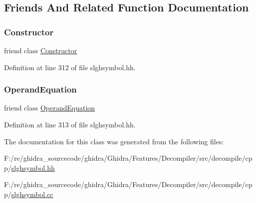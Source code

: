 \subsection{Friends And Related Function Documentation}
\mbox{\label{class_operand_symbol_a519e920ccec7617186a838b3258ff7d2}} 
\subsubsection{\texorpdfstring{Constructor}{Constructor}}
{\footnotesize\ttfamily friend class \mbox{\hyperlink{class_constructor}{Constructor}}\hspace{0.3cm}{\ttfamily [friend]}}



Definition at line 312 of file slghsymbol.\+hh.

\mbox{\label{class_operand_symbol_a466eb718dfbfae6a840e546d48e95627}} 
\subsubsection{\texorpdfstring{OperandEquation}{OperandEquation}}
{\footnotesize\ttfamily friend class \mbox{\hyperlink{class_operand_equation}{Operand\+Equation}}\hspace{0.3cm}{\ttfamily [friend]}}



Definition at line 313 of file slghsymbol.\+hh.



The documentation for this class was generated from the following files\+:\begin{DoxyCompactItemize}
\item 
F\+:/re/ghidra\+\_\+sourcecode/ghidra/\+Ghidra/\+Features/\+Decompiler/src/decompile/cpp/\mbox{\hyperlink{slghsymbol_8hh}{slghsymbol.\+hh}}\item 
F\+:/re/ghidra\+\_\+sourcecode/ghidra/\+Ghidra/\+Features/\+Decompiler/src/decompile/cpp/\mbox{\hyperlink{slghsymbol_8cc}{slghsymbol.\+cc}}\end{DoxyCompactItemize}

